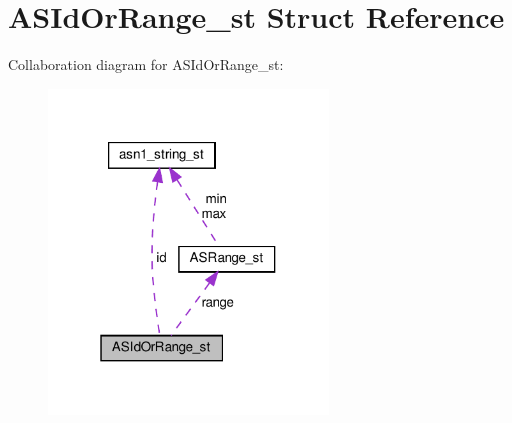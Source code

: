 \hypertarget{structASIdOrRange__st}{}\section{A\+S\+Id\+Or\+Range\+\_\+st Struct Reference}
\label{structASIdOrRange__st}


Collaboration diagram for A\+S\+Id\+Or\+Range\+\_\+st\+:
\nopagebreak
\begin{figure}[H]
\begin{center}
\leavevmode
\includegraphics[width=211pt]{structASIdOrRange__st__coll__graph}
\end{center}
\end{figure}

